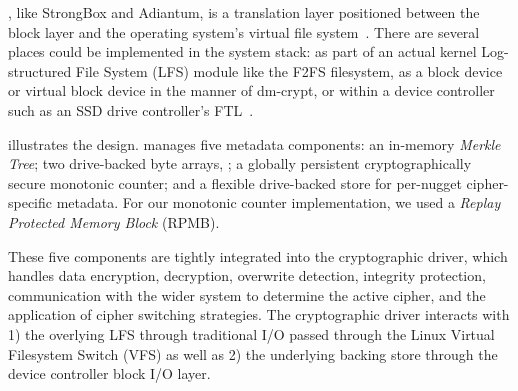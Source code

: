  

\SYSTEM{}, like StrongBox and Adiantum, is a translation layer positioned
between the block layer and the operating system's virtual file
system~\cite{StrongBox}. There are several places \SYSTEM{} could be implemented
in the system stack: as part of an actual kernel Log-structured File System
(LFS) module like the F2FS filesystem, as a block device or virtual block device
in the manner of dm-crypt, or within a device controller such as an SSD drive
controller's FTL~\cite{StrongBox}.

 illustrates the \SYSTEM{} design. \SYSTEM{} manages five
metadata components: an in-memory \emph{Merkle Tree}; two drive-backed byte
arrays, ; a
globally persistent cryptographically secure monotonic counter; and a flexible
drive-backed store for per-nugget cipher-specific metadata. For our monotonic
counter implementation, we used a \emph{Replay Protected Memory Block} (RPMB).

These five components are tightly integrated into the cryptographic driver,
which handles data encryption, decryption, overwrite detection, integrity
protection, communication with the wider system to determine the active cipher,
and the application of cipher switching strategies. The cryptographic driver
interacts with 1) the overlying LFS through traditional I/O passed through the
Linux Virtual Filesystem Switch (VFS) as well as 2) the underlying backing store
through the device controller block I/O layer.


